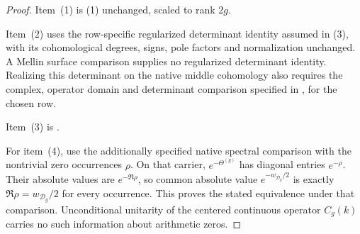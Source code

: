 \begin{proof}
Item~(1) is (1) unchanged,
scaled to rank \(2g\).

Item~(2) uses the row-specific regularized determinant identity
assumed in (3), with its
cohomological degrees, signs, pole factors and normalization unchanged.
A Mellin surface comparison supplies no regularized determinant
identity. Realizing this determinant on the native middle cohomology
also requires the complex, operator domain and determinant comparison
specified in , for the chosen row.

Item~(3) is .

For item~(4), use the additionally specified native spectral
comparison with the nontrivial zero occurrences $\rho$.
On that carrier, $e^{-\Theta^{(g)}}$ has diagonal entries $e^{-\rho}$.
Their absolute values are $e^{-\Re\rho}$, so common absolute value
$e^{-w_{\mathcal D_g}/2}$ is exactly
$\Re\rho=w_{\mathcal D_g}/2$ for every occurrence.
This proves the stated equivalence under that comparison.
Unconditional unitarity of the centered continuous operator $C_g(k)$
carries no such information about arithmetic zeros.
\end{proof}

